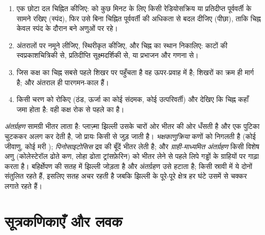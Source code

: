 \begin{method}[किसी अणु का कोशिका में पीछा करना]\label{met:b1:eukaryotic-cell:pulsechase}
\begin{enumerate}
  \item एक छोटा दल चिह्नित कीजिए:  को कुछ मिनट के लिए किसी
        रेडियोसक्रिय या प्रतिदीप्त पूर्ववर्ती के सामने रखिए (स्पंद), फिर
        उसे बिना चिह्नित पूर्ववर्ती की अधिकता से बदल दीजिए (पीछा), ताकि
        चिह्न केवल स्पंद के दौरान बने अणुओं पर रहे।
  \item अंतरालों पर नमूने लीजिए, स्थिरीकृत कीजिए, और चिह्न का स्थान
        निकालिए: काटों की स्वप्रकाशचित्रिकी से, प्रतिदीप्ति
        सूक्ष्मदर्शिकी से, या प्रभाजन और गणना से।
  \item जिस कक्ष का चिह्न सबसे पहले शिखर पर पहुँचता है वह ऊपर-प्रवाह में
        है; शिखरों का क्रम ही मार्ग है; और अंतराल ही पारगमन-काल हैं।
  \item किसी चरण को रोकिए (ठंड, ऊर्जा का कोई संदमक, कोई उत्परिवर्ती) और
        देखिए कि चिह्न कहाँ जमा होता है: वही कक्ष रोक से पहले का है।
\end{enumerate}
\end{method}

\begin{definition}[अंतर्ग्रहण]\label{def:b1:eukaryotic-cell:endocytosis}
\emph{अंतर्ग्रहण} सामग्री भीतर लाता है: प्लाज़्मा
झिल्ली उसके चारों ओर भीतर की ओर धँसती है और एक पुटिका चुटककर अलग कर देती
है, जो प्रायः किसी  से जुड़ जाती है। \emph{भक्षकाणुक्रिया} कणों को
निगलती है (कोई जीवाणु, कोई मरी ); \emph{पिनोसाइटोसिस} द्रव की
बूँदें भीतर लेती है; और \emph{ग्राही-माध्यमित अंतर्ग्रहण} किसी विशेष
अणु (कोलेस्टेरॉल ढोते कण, लोहा ढोता ट्रांसफ़ेरिन) को भीतर लेने से पहले
लिपे गड्ढों के ग्राहियों पर गाढ़ा करता है। बहिर्क्षेपण  की सतह में
झिल्ली जोड़ता है और अंतर्ग्रहण उसे हटाता है; किसी स्रावी  में ये
दोनों संतुलित रहते हैं, इसलिए सतह अचर रहती है जबकि झिल्ली के पूरे-पूरे
क्षेत्र हर घंटे उसमें से चक्कर लगाते रहते हैं।
\end{definition}

\section{सूत्रकणिकाएँ और लवक}

